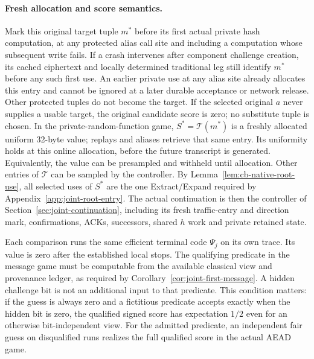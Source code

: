 \documentclass[pdflatex]{sn-jnl}
\theoremstyle{thmstyleone}
\theoremstyle{thmstylethree}
\theoremstyle{thmstyletwo}
\begin{document}
\paragraph{Fresh allocation and score semantics.}
Mark this original target tuple $m^*$ before its first actual private hash
computation, at any protected alias call site and including a computation
whose subsequent write fails. If a crash intervenes after component
challenge creation, its cached ciphertext and locally determined traditional
leg still identify $m^*$ before any such first use. An earlier private use
at any alias site already allocates this entry and cannot be ignored at a
later durable acceptance or network release. Other protected tuples do not
become the target. If the selected original $a$ never supplies a usable
target, the original candidate score is zero; no substitute tuple is chosen.
In the private-random-function game,
$S^*=\mathcal T(m^*)$ is a freshly allocated uniform 32-byte value;
replays and aliases retrieve that same entry. Its uniformity holds at
this online allocation, before the future transcript is generated.
Equivalently, the value can be presampled and withheld until allocation.
Other entries of $\mathcal T$ can be sampled by the controller. By
Lemma~\ref{lem:cb-native-root-use}, all selected uses of $S^*$ are the
one Extract/Expand required by Appendix~\ref{app:joint-root-entry}.
The actual continuation is then the controller of
Section~\ref{sec:joint-continuation}, including its fresh traffic-entry
and direction mark, confirmations, ACKs, successors, shared $h$ work and
private retained state.

Each comparison runs the same efficient terminal code $\Psi_j$ on its own
trace. Its value is zero after the established local stops. The qualifying
predicate in the message game must be computable from the available
classical view and provenance ledger, as required by
Corollary~\ref{cor:joint-first-message}. A hidden challenge bit is not an
additional input to that predicate. This condition matters: if the guess
is always zero and a fictitious predicate accepts exactly when the hidden
bit is zero, the qualified signed score has expectation $1/2$ even for an
otherwise bit-independent view. For the admitted predicate, an independent
fair guess on disqualified runs realizes the full qualified score in the
actual AEAD game.
\end{document}
